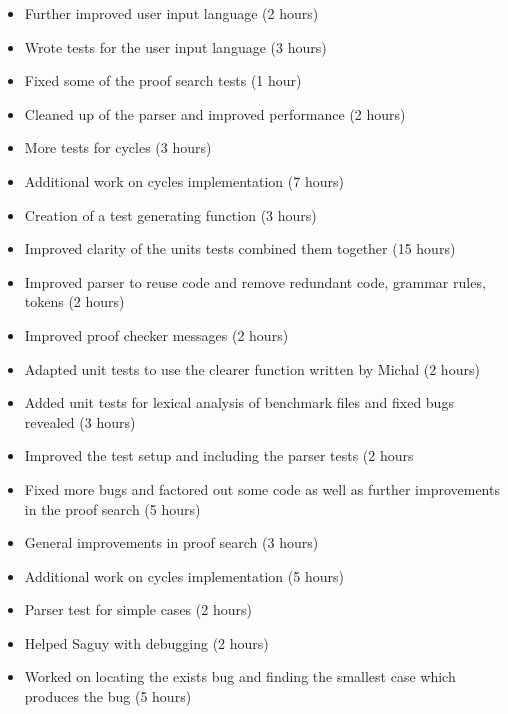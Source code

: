 %
{ \begin{itemize} 
 \item Further improved user input language (2 hours)
 \item Wrote tests for the user input language (3 hours)
 \item Fixed some of the proof search tests (1 hour)
 \item Cleaned up of the parser and improved performance (2 hours)
 \end{itemize} 
}%
{ \begin{itemize} 
 \item More tests for cycles (3 hours)
 \item Additional work on cycles implementation (7 hours)
 \end{itemize} 
}%
{ \begin{itemize} 
\item Creation of a test generating function (3 hours)
\item Improved clarity of the units tests combined them together (15 hours)
 \end{itemize} 
}%
{ \begin{itemize} 
  \item Improved parser to reuse code and remove redundant code, grammar rules, tokens (2 hours)
  \item Improved proof checker messages (2 hours)
  \item Adapted unit tests to use the clearer function written by Michal (2 hours)
  \item Added unit tests for lexical analysis of benchmark files and fixed bugs revealed (3 hours)
 \end{itemize} 
}%

%
{ \begin{itemize} 
 \item Improved the test setup and including the parser tests (2 hours
 \item Fixed more bugs and factored out some code as well as further improvements in
the proof search (5 hours)
 \end{itemize} 
}%
{ \begin{itemize} 
 \item General improvements in proof search (3 hours)
 \item Additional work on cycles implementation (5 hours)
 \end{itemize} 
}%
{ \begin{itemize} 
\item Parser test for simple cases (2 hours)
\item Helped Saguy with debugging (2 hours)
 \end{itemize} 
}%
{ \begin{itemize} 
 \item Worked on locating the exists bug and finding the smallest case which produces the bug (5 hours)
 \end{itemize} 
}%

